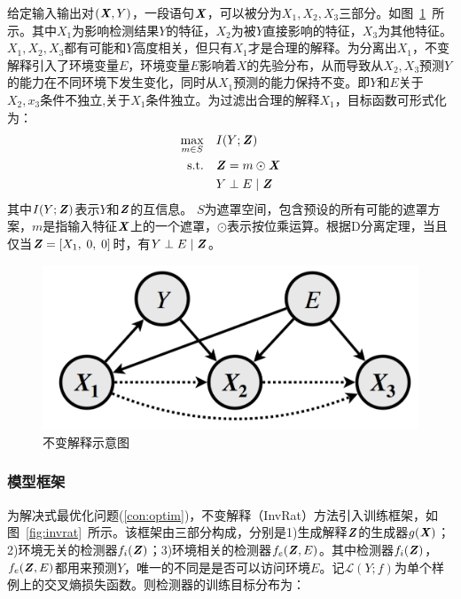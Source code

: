 给定输入输出对$(\textbf{\textit{X}},Y)$，一段语句$\textbf{\textit{X}}$，可以被分为$X_1,X_2,X_3$三部分。如图~\ref{fig:form}~所示。其中$X_1$为影响检测结果$Y$的特征，$X_2$为被$Y$直接影响的特征，$X_3$为其他特征。$X_1,X_2,X_3$都有可能和$Y$高度相关，但只有$X_1$才是合理的解释。为分离出$X_1$，不变解释引入了环境变量$E$，环境变量$E$影响着$X$的先验分布，从而导致从$X_2,X_3$预测$Y$的能力在不同环境下发生变化，同时从$X_1$预测的能力保持不变。即$Y$和$E$关于$X_2,x_3$条件不独立,关于$X_1$条件独立。为过滤出合理的解释$X_1$，目标函数可形式化为：
\begin{equation}
    \begin{aligned}
    \max_{m \in S} \quad & I(Y;\textbf{\textit{Z}}) \\
    \text{s.t.}\quad & \textbf{\textit{Z}} = m \odot \textbf{\textit{X}} \\
                & Y \perp E \mid \textbf{\textit{Z}}
    \end{aligned}
    \label{con:optim}
\end{equation}
其中$I(Y;\textbf{\textit{Z}})$表示$Y$和$\textbf{\textit{Z}}$的互信息。 $S$为遮罩空间，包含预设的所有可能的遮罩方案，$m$是指输入特征$\textbf{\textit{X}}$上的一个遮罩，$\odot$表示按位乘运算。根据D分离定理，当且仅当$\textbf{\textit{Z}}=[X_1,\;0,\;0]$时，有$Y \perp E \mid \textbf{\textit{Z}}$。
\begin{figure}
    \centering
    \includegraphics[width=.5\textwidth]{figs/form.png}
    \caption{不变解释示意图\cite{chang2020invariant}}
    \label{fig:form}
\end{figure}

\subsubsection{模型框架}

为解决式最优化问题(\ref{con:optim})，不变解释（InvRat）方法\cite{chang2020invariant}引入训练框架，如图~\ref{fig:invrat}~所示。该框架由三部分构成，分别是1)生成解释$\textbf{\textit{Z}}$的生成器$g(\textbf{\textit{X}})$；2)环境无关的检测器$f_i(\textbf{\textit{Z}})$；3)环境相关的检测器$f_e(\textbf{\textit{Z}},E)$。其中检测器$f_i(\textbf{\textit{Z}})$，$f_e(\textbf{\textit{Z}},E)$都用来预测$Y$，唯一的不同是是否可以访问环境$E$。记$\mathcal{L}(Y;f)$为单个样例上的交叉熵损失函数。则检测器的训练目标分布为：

